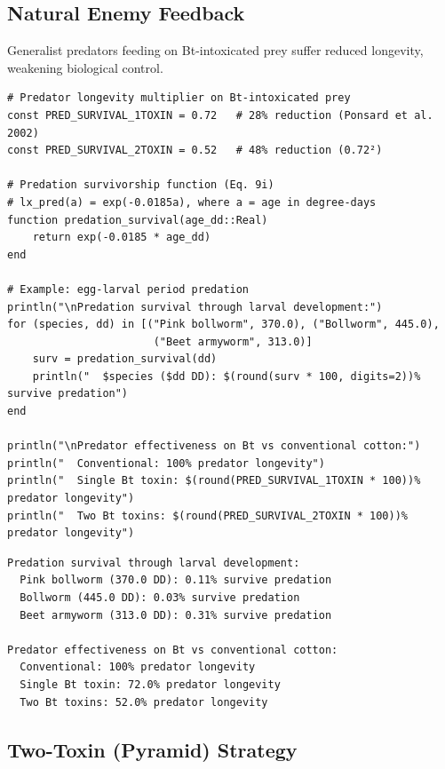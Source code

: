\subsection{Natural Enemy Feedback}



\label{1391854459745254563}{}


Generalist predators feeding on Bt-intoxicated prey suffer reduced longevity, weakening biological control.




\begin{verbatim}
# Predator longevity multiplier on Bt-intoxicated prey
const PRED_SURVIVAL_1TOXIN = 0.72   # 28% reduction (Ponsard et al. 2002)
const PRED_SURVIVAL_2TOXIN = 0.52   # 48% reduction (0.72²)

# Predation survivorship function (Eq. 9i)
# lx_pred(a) = exp(-0.0185a), where a = age in degree-days
function predation_survival(age_dd::Real)
    return exp(-0.0185 * age_dd)
end

# Example: egg-larval period predation
println("\nPredation survival through larval development:")
for (species, dd) in [("Pink bollworm", 370.0), ("Bollworm", 445.0),
                       ("Beet armyworm", 313.0)]
    surv = predation_survival(dd)
    println("  $species ($dd DD): $(round(surv * 100, digits=2))% survive predation")
end

println("\nPredator effectiveness on Bt vs conventional cotton:")
println("  Conventional: 100% predator longevity")
println("  Single Bt toxin: $(round(PRED_SURVIVAL_1TOXIN * 100))% predator longevity")
println("  Two Bt toxins: $(round(PRED_SURVIVAL_2TOXIN * 100))% predator longevity")
\end{verbatim}




\begin{verbatim}
Predation survival through larval development:
  Pink bollworm (370.0 DD): 0.11% survive predation
  Bollworm (445.0 DD): 0.03% survive predation
  Beet armyworm (313.0 DD): 0.31% survive predation

Predator effectiveness on Bt vs conventional cotton:
  Conventional: 100% predator longevity
  Single Bt toxin: 72.0% predator longevity
  Two Bt toxins: 52.0% predator longevity
\end{verbatim}



\subsection{Two-Toxin (Pyramid) Strategy}



